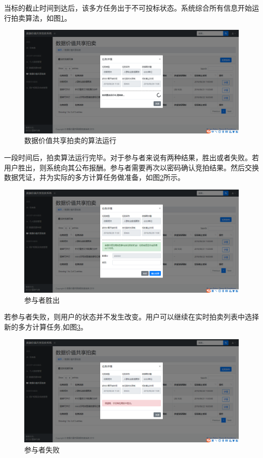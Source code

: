 \documentclass[promaster]{thesis-uestc}
\begin{document}
当标的截止时间到达后，该多方任务出于不可投标状态。系统综合所有信息开始运行拍卖算法，如图\ref{paimaiyunxing}。

\begin{figure}[H]
    \includegraphics[width=400pt]{ui/paimaiyunxing.png}
    \caption{数据价值共享拍卖的算法运行}
    \label{paimaiyunxing}
\end{figure}

一段时间后，拍卖算法运行完毕。对于参与者来说有两种结果，胜出或者失败。若用户胜出，则系统向其公布报酬。参与者需要再次以密码确认竞拍结果。然后交换数据凭证，并为实际的多方计算任务做准备，如图\ref{paimaichenggong}所示。

\begin{figure}[H]
    \includegraphics[width=400pt]{ui/paimaichenggong.png}
    \caption{参与者胜出}
    \label{paimaichenggong}
\end{figure}

若参与者失败，则用户的状态并不发生改变。用户可以继续在实时拍卖列表中选择新的多方计算任务,如图\ref{paimaishibai}。

\begin{figure}[H]
    \includegraphics[width=400pt]{ui/paimaishibai.png}
    \caption{参与者失败}
    \label{paimaishibai}
\end{figure}
\end{document}
